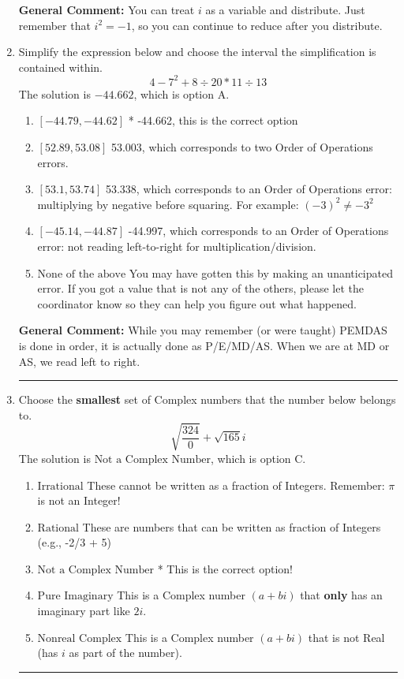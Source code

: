 \documentclass{extbook}[14pt]
\newcommand{\litem}[1]{\item #1

\rule{\textwidth}{0.4pt}}
\begin{document}
\begin{enumerate}
{\textbf{General Comment:} You can treat $i$ as a variable and distribute. Just remember that $i^2=-1$, so you can continue to reduce after you distribute.
}
\litem{
Simplify the expression below and choose the interval the simplification is contained within.
\[ 4 - 7^2 + 8 \div 20 * 11 \div 13 \]
The solution is \( -44.662 \), which is option A.\begin{enumerate}[label=\Alph*.]
\item \( [-44.79, -44.62] \)
* -44.662, this is the correct option
\item \( [52.89, 53.08] \)
 53.003, which corresponds to two Order of Operations errors.
\item \( [53.1, 53.74] \)
 53.338, which corresponds to an Order of Operations error: multiplying by negative before squaring. For example: $(-3)^2 \neq -3^2$
\item \( [-45.14, -44.87] \)
 -44.997, which corresponds to an Order of Operations error: not reading left-to-right for multiplication/division.
\item \( \text{None of the above} \)
 You may have gotten this by making an unanticipated error. If you got a value that is not any of the others, please let the coordinator know so they can help you figure out what happened.
\end{enumerate}

\textbf{General Comment:} While you may remember (or were taught) PEMDAS is done in order, it is actually done as P/E/MD/AS. When we are at MD or AS, we read left to right.
}
\litem{
Choose the \textbf{smallest} set of Complex numbers that the number below belongs to.
\[ \sqrt{\frac{324}{0}}+\sqrt{165} i \]
The solution is \( \text{Not a Complex Number} \), which is option C.\begin{enumerate}[label=\Alph*.]
\item \( \text{Irrational} \)
These cannot be written as a fraction of Integers. Remember: $\pi$ is not an Integer!
\item \( \text{Rational} \)
These are numbers that can be written as fraction of Integers (e.g., -2/3 + 5)
\item \( \text{Not a Complex Number} \)
* This is the correct option!
\item \( \text{Pure Imaginary} \)
This is a Complex number $(a+bi)$ that \textbf{only} has an imaginary part like $2i$.
\item \( \text{Nonreal Complex} \)
This is a Complex number $(a+bi)$ that is not Real (has $i$ as part of the number).
\end{enumerate}

}
\end{enumerate}
\end{document}
